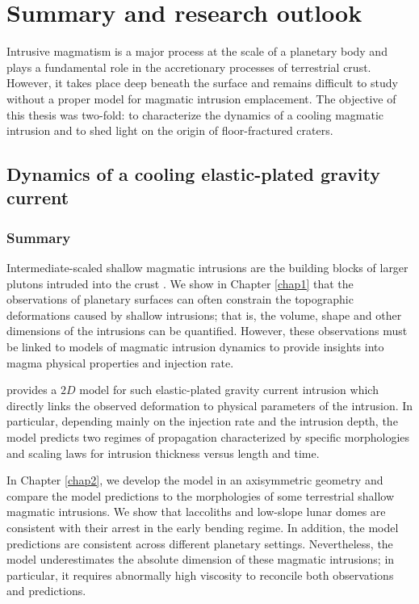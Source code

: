 \chapter{Summary and research outlook}
\label{chap9}

\minitoc

Intrusive magmatism  is a major  process at  the scale of  a planetary
body and  plays a  fundamental role in  the accretionary  processes of
terrestrial crust.  However,  it takes place deep  beneath the surface
and remains  difficult to  study without a  proper model  for magmatic
intrusion emplacement.  The objective of  this thesis was two-fold: to
characterize the dynamics of a  cooling magmatic intrusion and to shed
light on the origin of floor-fractured craters.


\section{Dynamics of a cooling elastic-plated gravity current}

\subsection{Summary}
\label{sec:summary}

Intermediate-scaled  shallow  magmatic  intrusions  are  the  building
blocks    of    larger    plutons     intruded    into    the    crust
\citep{Petford:2000cc,Glazner:2004gv}.  We show in Chapter \ref{chap1}
that the  observations of planetary  surfaces can often  constrain the
topographic deformations  caused by  shallow intrusions; that  is, the
volume,  shape  and   other  dimensions  of  the   intrusions  can  be
quantified.  However, these  observations must be linked  to models of
magmatic intrusion  dynamics to  provide insights into  magma physical
properties and injection rate.

\citet{Michaut:2011kg} provides  a $2D$ model for  such elastic-plated
gravity   current  intrusion   which  directly   links  the   observed
deformation to  physical parameters of the  intrusion.  In particular,
depending mainly  on the injection  rate and the intrusion  depth, the
model predicts  two regimes  of propagation characterized  by specific
morphologies and  scaling laws  for intrusion thickness  versus length
and time.

In  Chapter  \ref{chap2}, we  develop  the  model in  an  axisymmetric
geometry and compare the model predictions to the morphologies of some
terrestrial shallow magmatic intrusions.   We show that laccoliths and
low-slope lunar  domes are consistent  with their arrest in  the early
bending  regime. In  addition,  the model  predictions are  consistent
across   different  planetary   settings.   Nevertheless,   the  model
underestimates the absolute dimension of these magmatic intrusions; in
particular, it  requires abnormally  high viscosity to  reconcile both
observations and predictions.

